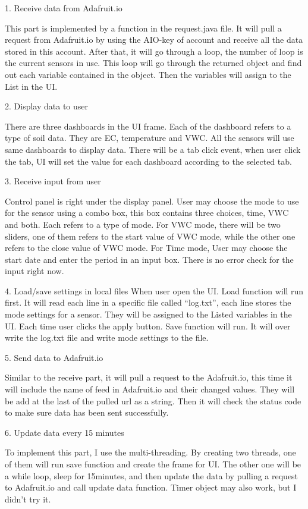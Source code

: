 \documentclass[onecolumn, draftclsnofoot,10pt, compsoc]{IEEEtran}
\begin{document}
	1.	Receive data from Adafruit.io
    	
    	This part is implemented by a function in the request.java file. It will pull a request from Adafruit.io by using the AIO-key of account and receive all the data stored in this account. After that, it will go through a loop, the number of loop is the current sensors in use. This loop will go through the returned object and find out each variable contained in the object. Then the variables will assign to the List in the UI.
        
     2.	Display data to user
     
     There are three dashboards in the UI frame. Each of the dashboard refers to a type of soil data. They are EC, temperature and VWC. All the sensors will use same dashboards to display data. There will be a tab click event, when user click the tab, UI will set the value for each dashboard according to the selected tab. 
     
     3.	Receive input from user
     
     Control panel is right under the display panel. User may choose the mode to use for the sensor using a combo box, this box contains three choices, time, VWC and both. Each refers to a type of mode. For VWC mode, there will be two sliders, one of them refers to the start value of VWC mode, while the other one refers to the close value of VWC mode.
For Time mode, User may choose the start date and enter the period in an input box. There is no error check for the input right now.

	4.	Load/save settings in local files
    When user open the UI. Load function will run first. It will read each line in a specific file called “log.txt”, each line stores the mode settings for a sensor. They will be assigned to the Listed variables in the UI. Each time user clicks the apply button. Save function will run. It will over write the log.txt file and write mode settings to the file.
    
    5.	Send data to Adafruit.io
    
    Similar to the receive part, it will pull a request to the Adafruit.io, this time it will include the name of feed in Adafruit.io and their changed values. They will be add at the last of the pulled url as a string. Then it will check the status code to make sure data has been sent successfully.
    
    6.	Update data every 15 minutes
    
    To implement this part, I use the multi-threading. By creating two threads, one of them will run save function and create the frame for UI. The other one will be a while loop, sleep for 15minutes, and then update the data by pulling a request to Adafruit.io and call update data function. Timer object may also work, but I didn’t try it.
    
\end{document}
